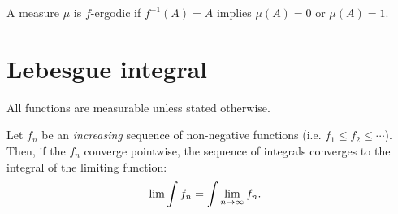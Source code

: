 \begin{definition}
  A measure $\mu$ is $f$-ergodic if $f^{-1}(A) = A$ implies $\mu(A) = 0$ or $\mu(A) = 1$.
\end{definition}

\section{Lebesgue integral}

All functions are measurable unless stated otherwise.

\begin{theorem*}[MCT]
  Let $f_n$ be an {\it increasing} sequence of non-negative functions (i.e. $f_1 \leq f_2 \leq \cdots$). Then, if
  the $f_n$ converge pointwise, the sequence of integrals converges to the integral of the limiting function:
  \begin{align*}
    \lim \int f_n &= \int \limn f_n.
  \end{align*}
\end{theorem*}


